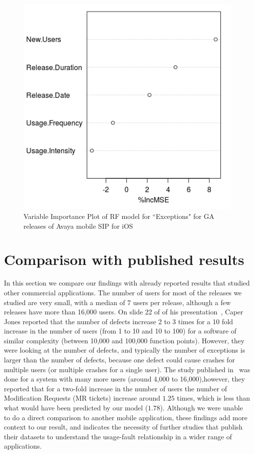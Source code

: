 \documentclass[smallextended]{svjour3}       %
\begin{document}
\begin{figure}[!t]
\centering
\includegraphics[width=0.4\linewidth]{rfI}%
\caption{Variable Importance Plot of RF model for ``Exceptions" for GA releases of Avaya mobile SIP for iOS}
\label{fig:rfI}
\vspace{-10pt}
\end{figure}

\section{Comparison with published results}\label{sec:compare}
In this section we compare our findings with already reported results that studied other commercial applications. 
The number of users for most of the releases we studied are very small, with a 
median of 7 users per release, although a few releases have more than 16,000 users.
On slide 22 of of his presentation~\cite{caper}, Caper Jones reported that the
number of defects increase 2 to 3 times for a 10 fold increase in the number of users
(from 1 to 10 and 10 to 100) for a software of similar complexity (between 10,000
and 100,000 function points). However, they were looking at the number of 
defects, and typically the number of 
exceptions is larger than the number of defects, because one defect could cause crashes for multiple users (or multiple crashes for a single user). The study published in~\cite{IQ08} was done for a system with many 
more users (around 4,000 to 16,000),however, they reported that for a two-fold increase in the 
number of users the number of Modification Requests (MR tickets) increase around $1.25$ times, 
which is less than what would have been predicted by our model ($1.78$). Although we
were unable to do a direct comparison to another mobile application, these findings add more context to our result, and indicates the necessity of further studies that publish their datasets to understand the usage-fault relationship in a wider range of applications.

\vspace{-10pt}
\end{document}
